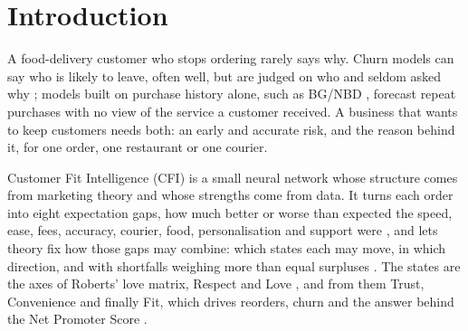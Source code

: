 \documentclass[10pt,twocolumn,letterpaper]{article}
\begin{document}
\section{Introduction}

A food-delivery customer who stops ordering rarely says why. Churn models can say who is likely to leave, often well, but are judged on who and seldom asked why \cite{neslin2006}; models built on purchase history alone, such as BG/NBD \cite{fader2005}, forecast repeat purchases with no view of the service a customer received. A business that wants to keep customers needs both: an early and accurate risk, and the reason behind it, for one order, one restaurant or one courier.

Customer Fit Intelligence (CFI) is a small neural network whose structure comes from marketing theory and whose strengths come from data. It turns each order into eight expectation gaps, how much better or worse than expected the speed, ease, fees, accuracy, courier, food, personalisation and support were \cite{oliver1980}, and lets theory fix how those gaps may combine: which states each may move, in which direction, and with shortfalls weighing more than equal surpluses \cite{mittal1998}. The states are the axes of Roberts' love matrix, Respect and Love \cite{roberts2004}, and from them Trust, Convenience and finally Fit, which drives reorders, churn and the answer behind the Net Promoter Score \cite{reichheld2003}.
\end{document}
